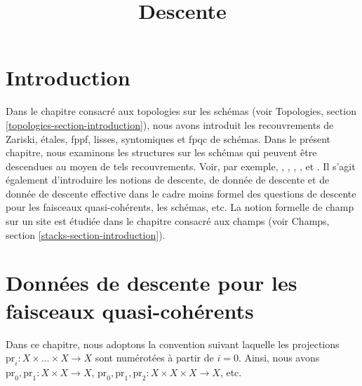 

%


\title{Descente}

\maketitle

\label{section-phantom}

\tableofcontents

\section{Introduction}
\label{section-introduction}

\noindent
Dans le chapitre consacré aux topologies sur les schémas
(voir Topologies, section \ref{topologies-section-introduction}), nous avons
introduit les recouvrements de Zariski, étales, fppf, lisses, syntomiques et
fpqc de schémas. Dans le présent chapitre, nous examinons les structures sur
les schémas qui peuvent être descendues au moyen de tels recouvrements. Voir, par
exemple, \cite{Gr-I}, \cite{Gr-II}, \cite{Gr-III}, \cite{Gr-IV}, \cite{Gr-V}
et \cite{Gr-VI}. Il s'agit également d'introduire les notions de descente, de
donnée de descente et de donnée de descente effective dans le cadre moins
formel des questions de descente pour les faisceaux quasi-cohérents, les
schémas, etc. La notion formelle de champ sur un site est étudiée dans le
chapitre consacré aux champs (voir Champs, section
\ref{stacks-section-introduction}).

\section{Données de descente pour les faisceaux quasi-cohérents}
\label{section-equivalence}

\noindent
Dans ce chapitre, nous adoptons la convention suivant laquelle les
projections $\text{pr}_i : X \times \ldots \times X \to X$ sont numérotées à
partir de $i = 0$. Ainsi, nous avons
$\text{pr}_0, \text{pr}_1 : X \times X  \to X$,
$\text{pr}_0, \text{pr}_1, \text{pr}_2 : X \times X \times X  \to X$, etc.


